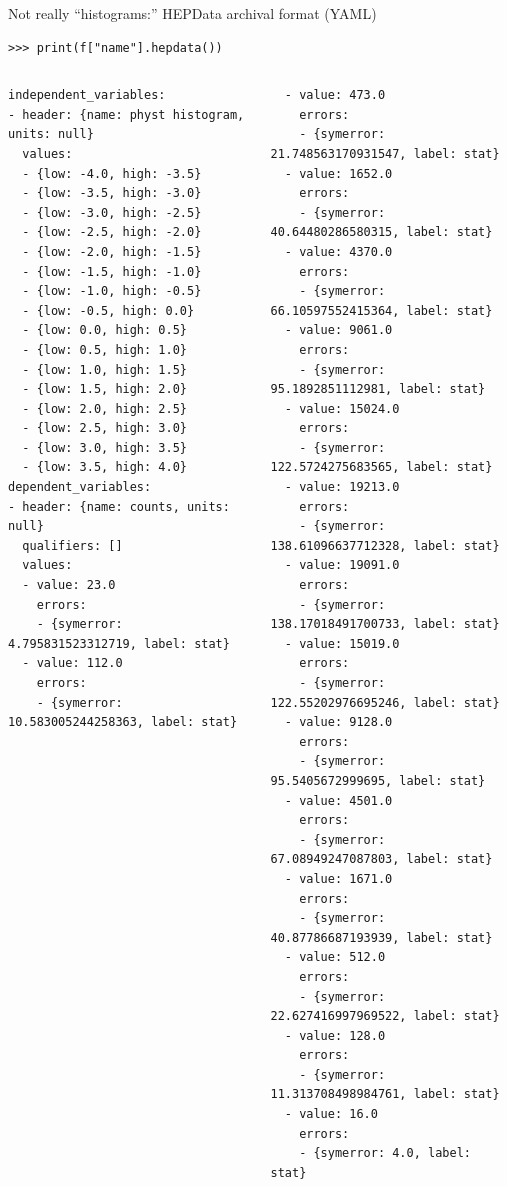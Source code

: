 \documentclass[aspectratio=169]{beamer}
\begin{document}
\begin{frame}[fragile]{Not really ``histograms:'' HEPData archival format (YAML)}
\small
\vspace{0.1 cm}
\begin{verbatim}
>>> print(f["name"].hepdata())
\end{verbatim}

\tiny
\vspace{-0.6 cm}
\begin{columns}[t]
\begin{verbatim}
independent_variables:
- header: {name: physt histogram, units: null}
  values:
  - {low: -4.0, high: -3.5}
  - {low: -3.5, high: -3.0}
  - {low: -3.0, high: -2.5}
  - {low: -2.5, high: -2.0}
  - {low: -2.0, high: -1.5}
  - {low: -1.5, high: -1.0}
  - {low: -1.0, high: -0.5}
  - {low: -0.5, high: 0.0}
  - {low: 0.0, high: 0.5}
  - {low: 0.5, high: 1.0}
  - {low: 1.0, high: 1.5}
  - {low: 1.5, high: 2.0}
  - {low: 2.0, high: 2.5}
  - {low: 2.5, high: 3.0}
  - {low: 3.0, high: 3.5}
  - {low: 3.5, high: 4.0}
dependent_variables:
- header: {name: counts, units: null}
  qualifiers: []
  values:
  - value: 23.0
    errors:
    - {symerror: 4.795831523312719, label: stat}
  - value: 112.0
    errors:
    - {symerror: 10.583005244258363, label: stat}
\end{verbatim}
\begin{verbatim}
  - value: 473.0
    errors:
    - {symerror: 21.748563170931547, label: stat}
  - value: 1652.0
    errors:
    - {symerror: 40.64480286580315, label: stat}
  - value: 4370.0
    errors:
    - {symerror: 66.10597552415364, label: stat}
  - value: 9061.0
    errors:
    - {symerror: 95.1892851112981, label: stat}
  - value: 15024.0
    errors:
    - {symerror: 122.5724275683565, label: stat}
  - value: 19213.0
    errors:
    - {symerror: 138.61096637712328, label: stat}
  - value: 19091.0
    errors:
    - {symerror: 138.17018491700733, label: stat}
  - value: 15019.0
    errors:
    - {symerror: 122.55202976695246, label: stat}
  - value: 9128.0
    errors:
    - {symerror: 95.5405672999695, label: stat}
  - value: 4501.0
    errors:
    - {symerror: 67.08949247087803, label: stat}
  - value: 1671.0
    errors:
    - {symerror: 40.87786687193939, label: stat}
  - value: 512.0
    errors:
    - {symerror: 22.627416997969522, label: stat}
  - value: 128.0
    errors:
    - {symerror: 11.313708498984761, label: stat}
  - value: 16.0
    errors:
    - {symerror: 4.0, label: stat}
\end{verbatim}
\end{columns}
\end{frame}
\end{document}
